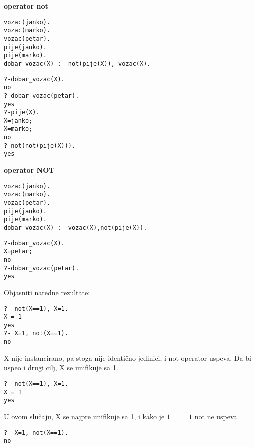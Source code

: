 \documentclass[../main.tex]{subfiles}
\begin{document}
\begin{boxprimer}
\begin{example} {\bf operator not}

\begin{multicols}{2}

\begin{Verbatim}
vozac(janko).
vozac(marko).
vozac(petar).
pije(janko).
pije(marko).
dobar_vozac(X) :- not(pije(X)), vozac(X).
\end{Verbatim}
\columnbreak
\begin{Verbatim}
?-dobar_vozac(X).
no
?-dobar_vozac(petar).
yes
?-pije(X).
X=janko;
X=marko;
no
?-not(not(pije(X))).
yes
\end{Verbatim}

\end{multicols}

\end{example}
\end{boxprimer}

\begin{boxprimer}
\begin{example} {\bf operator NOT}

\begin{multicols}{2}

\begin{Verbatim}
vozac(janko).
vozac(marko).
vozac(petar).
pije(janko).
pije(marko).
dobar_vozac(X) :- vozac(X),not(pije(X)).
\end{Verbatim}
\columnbreak

\begin{Verbatim}
?-dobar_vozac(X).
X=petar;
no
?-dobar_vozac(petar).
yes
\end{Verbatim}

\end{multicols}

\end{example}
\end{boxprimer}

\begin{boxprimer}
\begin{multicols}{2}
Objasniti naredne rezultate:
\begin{Verbatim}
?- not(X==1), X=1.
X = 1
yes
?- X=1, not(X==1).
no
\end{Verbatim}

\columnbreak
X nije instancirano, pa stoga nije identično jedinici, i not operator uspeva.
Da bi uspeo i drugi cilj, X se unifikuje sa 1.
\begin{Verbatim}
?- not(X==1), X=1.
X = 1
yes
\end{Verbatim}
U ovom slučaju, X se najpre unifikuje sa 1, i kako je $1 == 1$ not ne uspeva.
\begin{Verbatim}
?- X=1, not(X==1).
no
\end{Verbatim}
\end{multicols}
\end{boxprimer}
\end{document}

